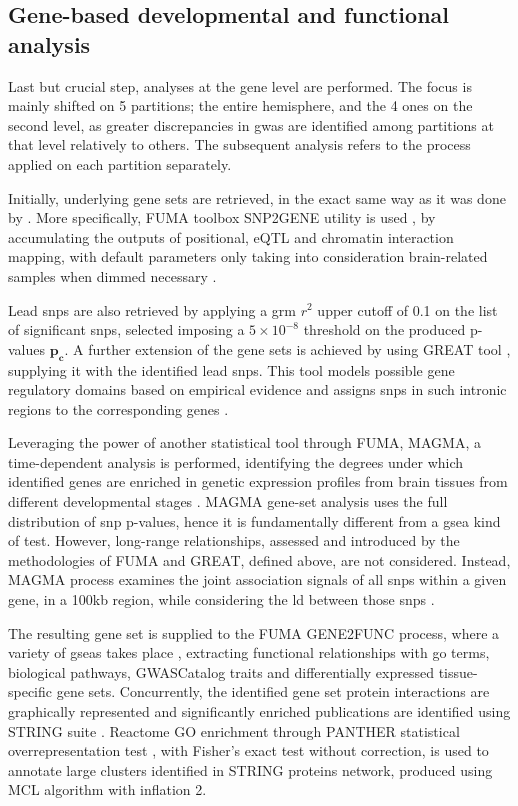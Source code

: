 \subsection{Gene-based developmental and functional analysis}
\label{subsec:func_mat_methods}
Last but crucial step, analyses at the gene level are performed. The focus is mainly shifted on 5 partitions; the entire hemisphere, and the 4 ones on the second level, as greater discrepancies in \ac{gwas} are identified among partitions at that level relatively to others. The subsequent analysis refers to the process applied on each partition separately.

Initially, underlying gene sets are retrieved, in the exact same way as it was done by \citet{Sha2021}. More specifically, FUMA toolbox SNP2GENE  utility is used \cite{Watanabe2017}, by accumulating the outputs of positional, eQTL and chromatin interaction mapping, with default parameters only taking into consideration brain-related samples when dimmed necessary \cite{Sha2021,Watanabe2017}. 

Lead \acp{snp} are also retrieved by applying a \ac{grm} $r^2$ upper cutoff of 0.1 on the list of significant \acp{snp}, selected imposing a $5\times 10 ^ {-8}$ threshold on the produced p-values $\mathbf{p_c}$. A further extension of the gene sets is achieved by using GREAT tool \cite{McLean2010}, supplying it with the identified lead \acp{snp}. This tool models possible gene regulatory domains based on empirical evidence and assigns \acp{snp} in such intronic regions to the corresponding genes \cite{McLean2010}.

Leveraging the power of another statistical tool through FUMA, MAGMA, a time-dependent analysis is performed, identifying the degrees under which identified genes are enriched in genetic expression profiles from brain tissues from different developmental stages \cite{DeLeeuw2015}. MAGMA gene-set analysis uses the full distribution of \ac{snp} p-values, hence it is fundamentally different from a \ac{gsea} kind of test. However, long-range relationships, assessed and introduced by the methodologies of FUMA and GREAT, defined above, are not considered. Instead, MAGMA process examines the joint association signals of all \acp{snp} within a given gene, in a 100kb region, while considering the \ac{ld} between those \acp{snp} \cite{DeLeeuw2015,Sha2021}.

The resulting gene set is supplied to the FUMA GENE2FUNC process, where a variety of \acp{gsea} takes place \cite{Watanabe2017}, extracting functional relationships with \ac{go} terms, biological pathways, GWASCatalog traits and differentially expressed tissue-specific gene sets. Concurrently, the identified gene set protein interactions are graphically represented and significantly enriched publications are identified using STRING suite \cite{Szklarczyk2021}. Reactome GO enrichment through PANTHER statistical overrepresentation test \cite{Mi2019}, with Fisher's exact test without correction, is used to annotate large clusters identified in STRING proteins network, produced using MCL algorithm with inflation 2.

	


